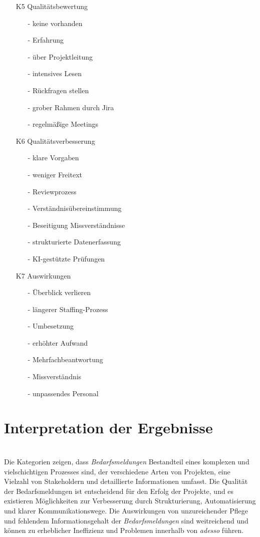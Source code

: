 \begin{itemize}
\begin{itemize}
	\end{itemize}
	\item[K5] Qualitätsbewertung
	\begin{itemize}
		\item[-] keine vorhanden
		\item[-] Erfahrung
		\item[-] über Projektleitung
		\item[-] intensives Lesen
		\item[-] Rückfragen stellen
		\item[-] grober Rahmen durch Jira
		\item[-] regelmäßige Meetings
	\end{itemize}
	\item[K6] Qualitätsverbesserung
	\begin{itemize}
		\item[-] klare Vorgaben
		\item[-] weniger Freitext
		\item[-] Reviewprozess
		\item[-] Verständnisübereinstimmung
		\item[-] Beseitigung Missverständnisse
		\item[-] strukturierte Datenerfassung
		\item[-] KI-gestützte Prüfungen
	\end{itemize}
	\item[K7] Auswirkungen
	\begin{itemize}
		\item[-] Überblick verlieren
		\item[-] längerer Staffing-Prozess
		\item[-] Umbesetzung
		\item[-] erhöhter Aufwand
		\item[-] Mehrfachbeantwortung
		\item[-] Missverständnis
		\item[-] unpassendes Personal
	\end{itemize}
\end{itemize}
\section{Interpretation der Ergebnisse}
\\
Die Kategorien zeigen, dass \emph{Bedarfsmeldungen} Bestandteil eines komplexen und vielschichtigen Prozesses sind, der verschiedene Arten von Projekten, eine Vielzahl von Stakeholdern und detaillierte Informationen umfasst. Die Qualität der Bedarfsmeldungen ist entscheidend für den Erfolg der Projekte, und es existieren Möglichkeiten zur Verbesserung durch Strukturierung, Automatisierung und klarer Kommunikationswege. Die Auswirkungen von unzureichender Pflege und fehlendem Informationsgehalt der \emph{Bedarfsmeldungen} sind weitreichend und können zu erheblicher Ineffizienz und Problemen innerhalb von \emph{adesso} führen.\\


